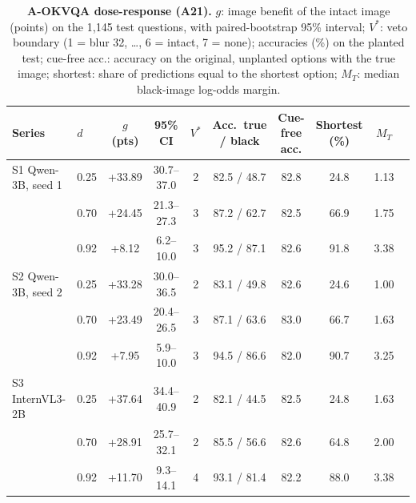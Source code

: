 \begin{table}[t]
  \centering
  \footnotesize
  \setlength{\tabcolsep}{4pt}
  \begin{tabular}{@{}llcccccccc@{}}
    \toprule
    Series & $d$ & $g$ (pts) & 95\% CI & $V^\ast$ & Acc.\ true / black & Cue-free acc. & Shortest (\%) & $M_T$ \\
    \midrule
    S1 Qwen-3B, seed 1 & 0.25 & +33.89 & 30.7--37.0 & 2 & 82.5 / 48.7 & 82.8 & 24.8 & 1.13 \\
     & 0.70 & +24.45 & 21.3--27.3 & 3 & 87.2 / 62.7 & 82.5 & 66.9 & 1.75 \\
     & 0.92 & +8.12 & 6.2--10.0 & 3 & 95.2 / 87.1 & 82.6 & 91.8 & 3.38 \\
    S2 Qwen-3B, seed 2 & 0.25 & +33.28 & 30.0--36.5 & 2 & 83.1 / 49.8 & 82.6 & 24.6 & 1.00 \\
     & 0.70 & +23.49 & 20.4--26.5 & 3 & 87.1 / 63.6 & 83.0 & 66.7 & 1.63 \\
     & 0.92 & +7.95 & 5.9--10.0 & 3 & 94.5 / 86.6 & 82.0 & 90.7 & 3.25 \\
    S3 InternVL3-2B & 0.25 & +37.64 & 34.4--40.9 & 2 & 82.1 / 44.5 & 82.5 & 24.8 & 1.63 \\
     & 0.70 & +28.91 & 25.7--32.1 & 2 & 85.5 / 56.6 & 82.6 & 64.8 & 2.00 \\
     & 0.92 & +11.70 & 9.3--14.1 & 4 & 93.1 / 81.4 & 82.2 & 88.0 & 3.38 \\
    \bottomrule
  \end{tabular}
  \caption{\textbf{A-OKVQA dose-response (A21).} $g$: image benefit of the intact image (points) on the 1{,}145 test questions, with paired-bootstrap 95\% interval; $V^\ast$: veto boundary (1 = blur 32, \dots, 6 = intact, 7 = none); accuracies (\%) on the planted test; cue-free acc.: accuracy on the original, unplanted options with the true image; shortest: share of predictions equal to the shortest option; $M_T$: median black-image log-odds margin.}
  \label{tab:a21}
\end{table}

